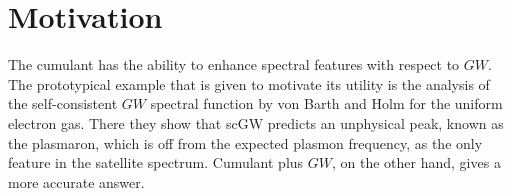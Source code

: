 








\section{Motivation}
The cumulant has the ability to enhance spectral features with respect to $GW$. The prototypical example that is given to motivate its utility is the analysis of the self-consistent $GW$ spectral function by von Barth and Holm for the uniform electron gas. There they show that scGW predicts an unphysical peak, known as the plasmaron, which is off from the expected plasmon frequency, as the only feature in the satellite spectrum. Cumulant plus $GW$, on the other hand, gives a more accurate answer. 
